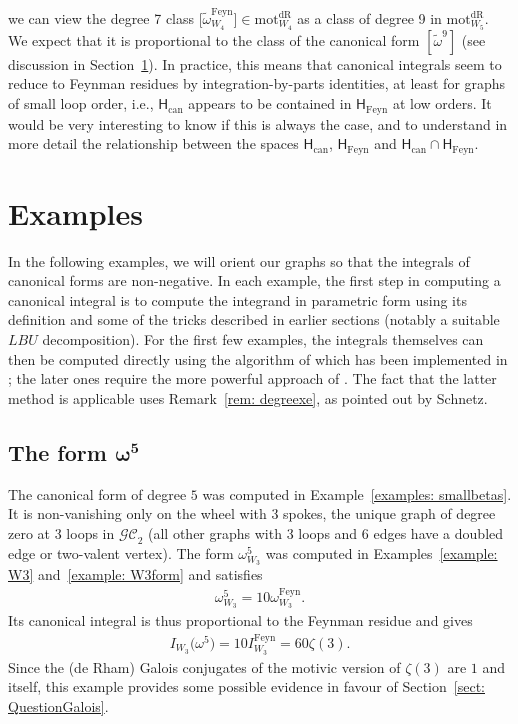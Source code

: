 \documentclass[pdftex]{sigma}%
\numberwithin{equation}{section}
\newcommand{\GC}{\mathcal{GC}}
\newcommand{\0}{\color{blue}{\mathsf{0}}}
\begin{document}
we can view the degree 7 class $\big[\widetilde{\omega}^{\mathrm{Feyn}}_{W_4}\big] \in \mathrm{mot}^{\mathrm{dR}}_{W_4}$ as a class of degree 9 in $\mathrm{mot}^{\mathrm{dR}}_{W_{5}}$. We expect that it is proportional to the class of the canonical form $[\widetilde{\omega}^9]$ (see discussion in Section~\ref{sect: Examples}).
In practice, this means that canonical integrals seem to reduce to Feynman residues by integration-by-parts identities, at least for graphs of small loop order, i.e., $ \mathsf{H}_{\mathrm{can}} $ appears to be contained in $ \mathsf{H}_{\mathrm{Feyn}} $ at low orders. It would be very interesting to know if this is always the case, and to understand in more detail the relationship between the spaces $\mathsf{H}_{\mathrm{can}}$, $\mathsf{H}_{\mathrm{Feyn}}$ and $\mathsf{H}_{\mathrm{can}} \cap \mathsf{H}_{\mathrm{Feyn}} $.





\section{Examples} \label{sect: Examples}
In the following examples, we will orient our graphs so that the integrals of canonical forms are non-negative.
In each example, the first step in computing a canonical integral is to compute the integrand in parametric form using its definition and some of the tricks described in earlier sections (notably a suitable $LBU$ decomposition). For the first few examples,
the integrals themselves can then be computed directly using the algorithm of \cite{Massless, PeriodsFeynman} which has been implemented in \cite{Bogner,Panzer}; the later ones require the more powerful approach of \cite{BorinskySchnetz}. The fact that the latter method is applicable uses Remark~\ref{rem: degreexe}, as pointed out by Schnetz.

\subsection[The form omega5]
{The form $\boldsymbol{\omega^5}$}
The canonical form of degree $5$ was computed in Example~\ref{examples: smallbetas}. It is non-vanishing only on the wheel with 3 spokes, the unique graph of degree zero at 3 loops in $\GC_2$ (all other graphs with 3 loops and 6 edges have a doubled edge or two-valent vertex). The form $\omega^5_{W_3}$ was computed in Examples~\ref{example: W3} and~\ref{example: W3form} and satisfies
\begin{gather*}
\omega^5_{W_3} = 10 \omega^{\mathrm{Feyn}}_{W_3}.
\end{gather*}
Its canonical integral is thus proportional to the Feynman residue and gives
\begin{gather*}
I_{W_3}\big(\omega^5\big) = 10 I^{\mathrm{Feyn}}_{W_3} = 60 \zeta(3).
\end{gather*}
Since the (de Rham) Galois conjugates of the motivic version of $\zeta(3)$ are $1$ and itself, this example provides some possible evidence in favour of
Section~\ref{sect: QuestionGalois}.
\end{document}

